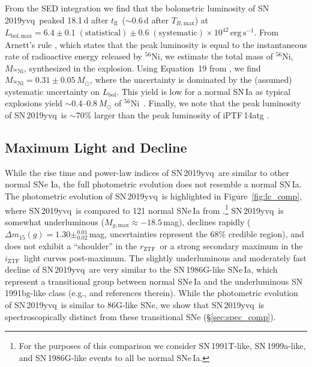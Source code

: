 \documentclass[twocolumn]{aastex63}
\newcommand{\rztf}{$r_\mathrm{ZTF}$}
\newcommand{\iztf}{$i_\mathrm{ZTF}$}
\newcommand{\tfl}{$t_\mathrm{fl}$}
\newcommand{\tbmax}{$T_{B,\mathrm{max}}$}
\newcommand{\radni}{$^{56}$Ni}
\newcommand{\sn}{SN\,2019yvq}
\begin{document}
From the SED integration we find that the bolometric luminosity of \sn\ peaked
18.1\,d after \tfl\ ($\sim$0.6\,d after \tbmax) at $L_\mathrm{bol,max} = 6.4
\pm 0.1\;(\mathrm{statistical}) \pm 0.6\;(\mathrm{systematic}) \times
10^{42}\,\mathrm{erg\,s}^{-1}$. From Arnett's rule \citep{Arnett82}, which
states that the peak luminosity is equal to the instantaneous rate of
radioactive energy released by \radni, we estimate the total mass of \radni,
$M_\mathrm{^{56}Ni}$, synthesized in the explosion. Using Equation~19 from
\citet[][see also \citealt{Stritzinger06,Howell09,Scalzo14}]{Nadyozhin94}, we
find $M_\mathrm{^{56}Ni} = 0.31 \pm 0.05\,M_\odot$, where the uncertainty is
dominated by the (assumed) systematic uncertainty on $L_\mathrm{bol}$. This
yield is low for a normal SN\,Ia as typical explosions yield
$\sim$0.4--0.8\,$M_\odot$ of \radni\ \citep[e.g.,][]{Scalzo14a}. Finally, we
note that the peak luminosity of \sn\ is $\sim$70\% larger than the peak
luminosity of iPTF\,14atg \citep[$3.8 \times
10^{42}\,\mathrm{erg\,s}^{-1}$;][]{Kromer16}.

\subsection{Maximum Light and Decline}\label{sec:max_decline}

While the rise time and power-law indices of \sn\ are similar to other normal
SNe Ia, the full photometric evolution does not resemble a normal SN\,Ia. The
photometric evolution of \sn\ is highlighted in Figure~\ref{fig:lc_comp},
where \sn\ is compared to 121 normal SNe\,Ia from \citet{Yao19}.\footnote{For
the purposes of this comparison we consider SN\,1991T-like, SN\,1999a-like,
and SN\,1986G-like events to all be normal SNe\,Ia.} \sn\ is somewhat
underluminous ($M_{g,\mathrm{max}} \approx -18.5$\,mag), declines rapidly
($\Delta m_{15}(g) = 1.30\pm^{0.01}_{0.02}$\,mag, uncertainties represent the
68\% credible region), and does not exhibit a ``shoulder'' in the \rztf\ or a
strong secondary maximum in the \iztf\ light curves post-maximum. The slightly
underluminous and moderately fast decline of \sn\ are very similar to the
SN\,1986G-like SNe\,Ia, which represent a transitional group between normal
SNe\,Ia and the underluminous SN\,1991bg-like class (e.g.,
\citealt{Taubenberger17} and references therein). While the photometric
evolution of \sn\ is similar to 86G-like SNe, we show that \sn\ is
spectroscopically distinct from these transitional SNe
(\S\ref{sec:spec_comp}).
\end{document}
